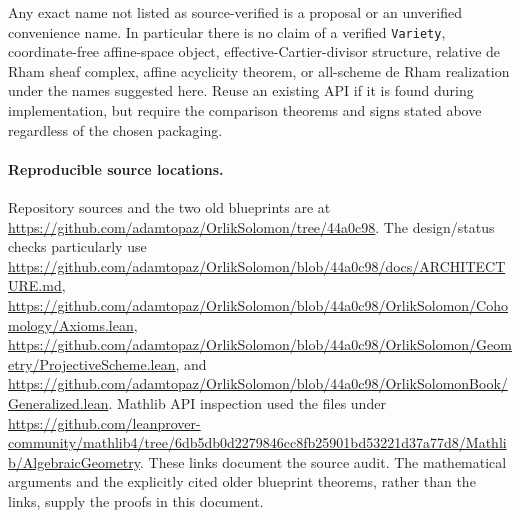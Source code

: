 \documentclass[11pt]{article}
\newcommand{\planned}[1]{\texttt{\detokenize{#1}}}
\theoremstyle{definition}
\theoremstyle{remark}
\renewcommand{\planned}[1]{\nolinkurl{#1}}
\begin{document}
Any exact name not listed as source-verified is a proposal or an unverified convenience name. In particular there is no claim of a verified \planned{Variety}, coordinate-free affine-space object, effective-Cartier-divisor structure, relative de Rham sheaf complex, affine acyclicity theorem, or all-scheme de Rham realization under the names suggested here. Reuse an existing API if it is found during implementation, but require the comparison theorems and signs stated above regardless of the chosen packaging.

\paragraph{Reproducible source locations.}
Repository sources and the two old blueprints are at
\url{https://github.com/adamtopaz/OrlikSolomon/tree/44a0c98}.
The design/status checks particularly use
\url{https://github.com/adamtopaz/OrlikSolomon/blob/44a0c98/docs/ARCHITECTURE.md},
\url{https://github.com/adamtopaz/OrlikSolomon/blob/44a0c98/OrlikSolomon/Cohomology/Axioms.lean},
\url{https://github.com/adamtopaz/OrlikSolomon/blob/44a0c98/OrlikSolomon/Geometry/ProjectiveScheme.lean}, and
\url{https://github.com/adamtopaz/OrlikSolomon/blob/44a0c98/OrlikSolomonBook/Generalized.lean}.
Mathlib API inspection used the files under
\url{https://github.com/leanprover-community/mathlib4/tree/6db5db0d2279846cc8fb25901bd53221d37a77d8/Mathlib/AlgebraicGeometry}.
These links document the source audit. The mathematical arguments and the explicitly cited older blueprint theorems, rather than the links, supply the proofs in this document.
\end{document}
